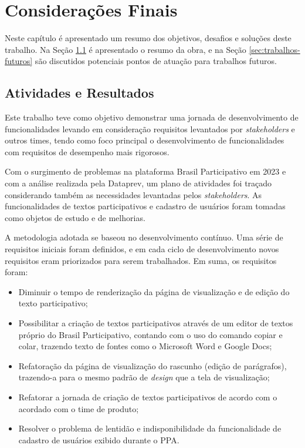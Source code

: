 \chapter {Considerações Finais}

Neste capítulo é apresentado um resumo dos objetivos, desafios e soluções deste trabalho.
Na Seção \ref{sec:atividades-e-resultados} é apresentado o resumo da obra, e na Seção \ref{sec:trabalhos-futuros} são discutidos potenciais pontos de atuação para trabalhos futuros.

\section {Atividades e Resultados}
\label{sec:atividades-e-resultados}

Este trabalho teve como objetivo demonstrar uma jornada de desenvolvimento de funcionalidades levando em consideração requisitos levantados por \textit{stakeholders} e outros times, tendo como foco principal o desenvolvimento de funcionalidades com requisitos de desempenho mais rigorosos.

Com o surgimento de problemas na plataforma Brasil Participativo em 2023 e com a análise realizada pela Dataprev, um plano de atividades foi traçado considerando também as necessidades levantadas pelos \textit{stakeholders}.
As funcionalidades de textos participativos e cadastro de usuários foram tomadas como objetos de estudo e de melhorias.

A metodologia adotada se baseou no desenvolvimento contínuo.
Uma série de requisitos iniciais foram definidos, e em cada ciclo de desenvolvimento novos requisitos eram priorizados para serem trabalhados. Em suma, os requisitos foram:

\begin{itemize}
	\item Diminuir o tempo de renderização da página de visualização e de edição do texto participativo;
	\item Possibilitar a criação de textos participativos através de um editor de textos próprio do Brasil Participativo, contando com o uso do comando copiar e colar, trazendo texto de fontes como o Microsoft Word e Google Docs;
	\item Refatoração da página de visualização do rascunho (edição de parágrafos), trazendo-a para o mesmo padrão de \textit{design} que a tela de visualização;
	\item Refatorar a jornada de criação de textos participativos de acordo com o acordado com o time de produto;
  \item Resolver o problema de lentidão e indisponibilidade da funcionalidade de cadastro de usuários exibido durante o PPA.
\end{itemize}

